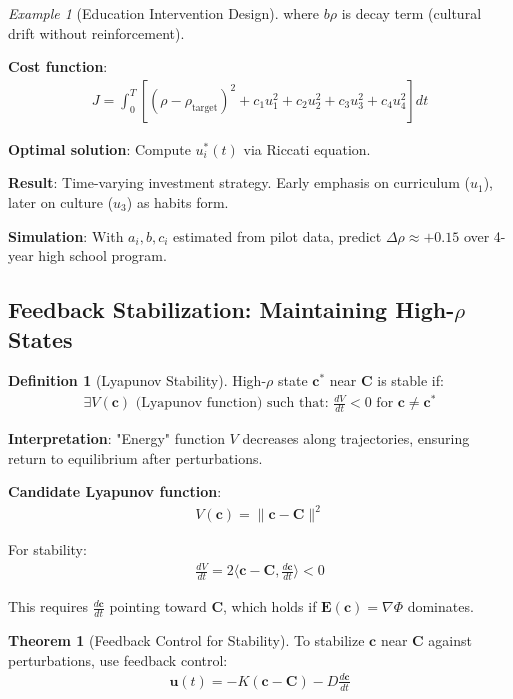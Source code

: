\documentclass[11pt,a4paper]{article}
\theoremstyle{definition}
\newtheorem{definition}{Definition}[section]
\newtheorem{theorem}{Theorem}[section]
\theoremstyle{remark}
\newtheorem{example}{Example}[section]
\newcommand{\EE}{\mathbf{E}}
\newcommand{\cc}{\mathbf{c}}
\begin{document}
\begin{enumerate}
\begin{example}[Education Intervention Design]
where \(b\rho\) is decay term (cultural drift without reinforcement).

\textbf{Cost function}:
\begin{align}
J = \int_0^T \left[(\rho - \rho_{\text{target}})^2 + c_1 u_1^2 + c_2 u_2^2 + c_3 u_3^2 + c_4 u_4^2\right] dt
\end{align}

\textbf{Optimal solution}: Compute \(u_i^*(t)\) via Riccati equation.

\textbf{Result}: Time-varying investment strategy. Early emphasis on curriculum (\(u_1\)), later on culture (\(u_3\)) as habits form.

\textbf{Simulation}: With \(a_i, b, c_i\) estimated from pilot data, predict \(\Delta\rho \approx +0.15\) over 4-year high school program.
\end{example}

\subsection{Feedback Stabilization: Maintaining High-\(\rho\) States}

\begin{definition}[Lyapunov Stability]
High-\(\rho\) state \(\cc^*\) near \(\mathbf{C}\) is stable if:
\begin{align}
\exists V(\cc) \text{ (Lyapunov function) such that: } \frac{dV}{dt} < 0 \text{ for } \cc \neq \cc^*
\end{align}

\textbf{Interpretation}: "Energy" function \(V\) decreases along trajectories, ensuring return to equilibrium after perturbations.

\textbf{Candidate Lyapunov function}:
\begin{align}
V(\cc) = \|\cc - \mathbf{C}\|^2
\end{align}

For stability:
\begin{align}
\frac{dV}{dt} = 2\langle \cc - \mathbf{C}, \frac{d\cc}{dt} \rangle < 0
\end{align}

This requires \(\frac{d\cc}{dt}\) pointing toward \(\mathbf{C}\), which holds if \(\EE(\cc) = \nabla \Phi\) dominates.
\end{definition}

\begin{theorem}[Feedback Control for Stability]
To stabilize \(\cc\) near \(\mathbf{C}\) against perturbations, use feedback control:
\begin{align}
\mathbf{u}(t) = -K(\cc - \mathbf{C}) - D\frac{d\cc}{dt}
\end{align}


\end{theorem}
\end{enumerate}
\end{document}
